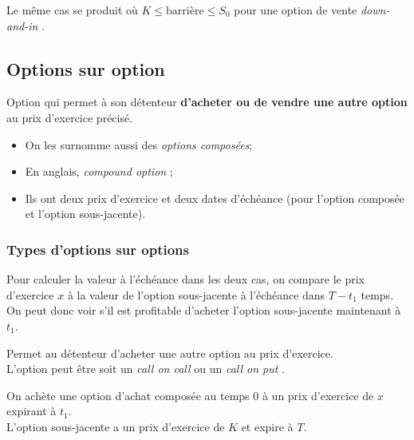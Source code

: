 \documentclass[10pt, french]{article}
\begin{document}
\begin{multicols*}{2}
Le même cas se produit où $K \leq \text{barrière} \leq S_{0}$ pour une option de vente \og \textit{down-and-in} \fg{}.


\columnbreak
\subsection{Options sur option}
\begin{definitionNOHFILL}
Option qui permet à son détenteur \textbf{d'acheter ou de vendre une autre option} au prix d'exercice précisé.

\tcbline

\begin{itemize}[leftmargin = *]
	\item	On les surnomme aussi des \textit{options composées};
	\item	En anglais, \og \textit{compound option} \fg{};
	\item	Ils ont deux prix d'exercice et deux dates d'échéance (pour l'option composée et l'option sous-jacente).
\end{itemize}
\end{definitionNOHFILL}

\subsubsection*{Types d'options sur options}
Pour calculer la valeur à l'échéance dans les deux cas, on compare le prix d'exercice $x$ à la valeur de l'option sous-jacente à l'échéance dans $T - t_{1}$ temps. On peut donc voir s'il est profitable d'acheter l'option sous-jacente maintenant à $t_{1}$.

\begin{definitionNOHFILLsub}
Permet au détenteur d'acheter une autre option au prix d'exercice.\\
L'option peut être soit un \og \textit{call on call} \fg{} ou un \og \textit{call on put} \fg{}.

\tcbline

On achète une option d'achat composée au temps 0 à un prix d'exercice de $x$ expirant à $t_{1}$.\\ L'option sous-jacente a un prix d'exercice de $K$ et expire à $T$.
\begin{center}


\begin{tikzpicture}[x=0.75pt,y=0.75pt,yscale=-1,xscale=1]


\end{tikzpicture}
\end{center}
\end{definitionNOHFILLsub}
\end{multicols*}
\end{document}
